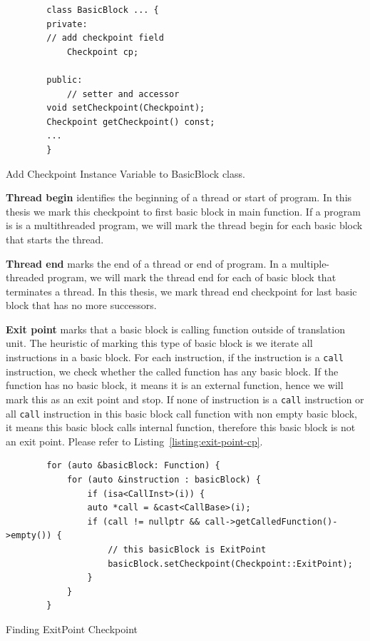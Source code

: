 \begin{listing}[htbp]
    \begin{verbatim}
        class BasicBlock ... {
        private:
        // add checkpoint field
            Checkpoint cp;

        public:
            // setter and accessor
        void setCheckpoint(Checkpoint);
        Checkpoint getCheckpoint() const;
        ...
        }
    \end{verbatim}
    \caption{Add Checkpoint Instance Variable to BasicBlock class.}    
    \label{listing:checkpoint}
\end{listing}

\vspace{0.5cm}
\noindent \textbf{Thread begin} identifies the beginning of a thread or start of
program. In this thesis we mark this checkpoint to first basic block in main
function. If a program is is a multithreaded program, we will mark the thread
begin for each basic block that starts the thread.

\vspace{0.5cm}
\noindent \textbf{Thread end} marks the end of a thread or end of program. In a
multiple-threaded program, we will mark the thread end for each of basic block
that terminates a thread. In this thesis, we mark thread end checkpoint for last
basic block that has no more successors.

\vspace{0.5cm}
\noindent \textbf{Exit point} marks that a basic block is calling function outside of translation
unit. The heuristic of marking this type of basic block is we iterate all
instructions in a basic block. For each instruction, if the instruction is a
\texttt{call} instruction, we check whether the called function has any basic
block. If the function has no basic block, it means it is an external function,
hence we will mark this as an exit point and stop. If none of instruction is a
\texttt{call} instruction or all \texttt{call} instruction in this basic block
call function with non empty basic block, it means this basic block calls
internal function, therefore this basic block is not an exit point. Please refer
to Listing~\ref{listing:exit-point-cp}.

\begin{listing}[htbp]
    \begin{verbatim}
        for (auto &basicBlock: Function) {
            for (auto &instruction : basicBlock) {
                if (isa<CallInst>(i)) {
                auto *call = &cast<CallBase>(i);
                if (call != nullptr && call->getCalledFunction()->empty()) {
                    // this basicBlock is ExitPoint
                    basicBlock.setCheckpoint(Checkpoint::ExitPoint);
                } 
            }
        } 
    \end{verbatim}
    \caption{Finding ExitPoint Checkpoint}    
    \label{listing:exit-point-cp}
\end{listing}

